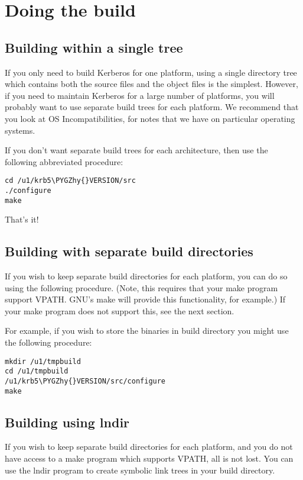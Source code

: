 \documentclass[letterpaper,10pt,english]{sphinxmanual}
\def\PYGZhy{\char`\-}
\begin{document}
\section{Doing the build}
\label{build/doing_build::doc}\label{build/doing_build:doing-the-build}

\subsection{Building within a single tree}
\label{build/doing_build:do-build}\label{build/doing_build:building-within-a-single-tree}
If you only need to build Kerberos for one platform, using a single
directory tree which contains both the source files and the object
files is the simplest.  However, if you need to maintain Kerberos for
a large number of platforms, you will probably want to use separate
build trees for each platform.  We recommend that you look at OS
Incompatibilities, for notes that we have on particular operating
systems.

If you don't want separate build trees for each architecture, then use
the following abbreviated procedure:

\begin{Verbatim}[commandchars=\\\{\}]
cd /u1/krb5\PYGZhy{}VERSION/src
./configure
make
\end{Verbatim}

That's it!


\subsection{Building with separate build directories}
\label{build/doing_build:building-with-separate-build-directories}
If you wish to keep separate build directories for each platform, you
can do so using the following procedure.  (Note, this requires that
your make program support VPATH.  GNU's make will provide this
functionality, for example.)  If your make program does not support
this, see the next section.

For example, if you wish to store the binaries in  build
directory you might use the following procedure:

\begin{Verbatim}[commandchars=\\\{\}]
mkdir /u1/tmpbuild
cd /u1/tmpbuild
/u1/krb5\PYGZhy{}VERSION/src/configure
make
\end{Verbatim}


\subsection{Building using lndir}
\label{build/doing_build:building-using-lndir}
If you wish to keep separate build directories for each platform, and
you do not have access to a make program which supports VPATH, all is
not lost.  You can use the lndir program to create symbolic link trees
in your build directory.
\end{document}
